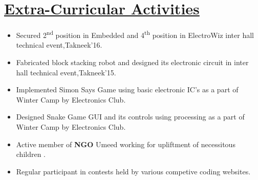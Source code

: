 \documentclass{article}
\begin{document}
\section*{\underline{Extra-Curricular Activities}}
\begin{itemize}
\item Secured 2\textsuperscript{nd} position in Embedded and 4\textsuperscript{th} position in ElectroWiz inter hall technical event,Takneek'16.
\item Fabricated block stacking robot and designed its electronic circuit in inter hall technical event,Takneek'15.
\item Implemented Simon Says Game using basic electronic IC's as a part of Winter Camp by Electronics Club.
\item Designed Snake Game GUI and its controls using processing as a part of Winter Camp by Electronics Club.  
\item Active member of \textbf{NGO} Umeed working for upliftment of necessitous children .
\item Regular participant in contests held by various competive coding websites. 



\end{itemize} 
\end{document}
